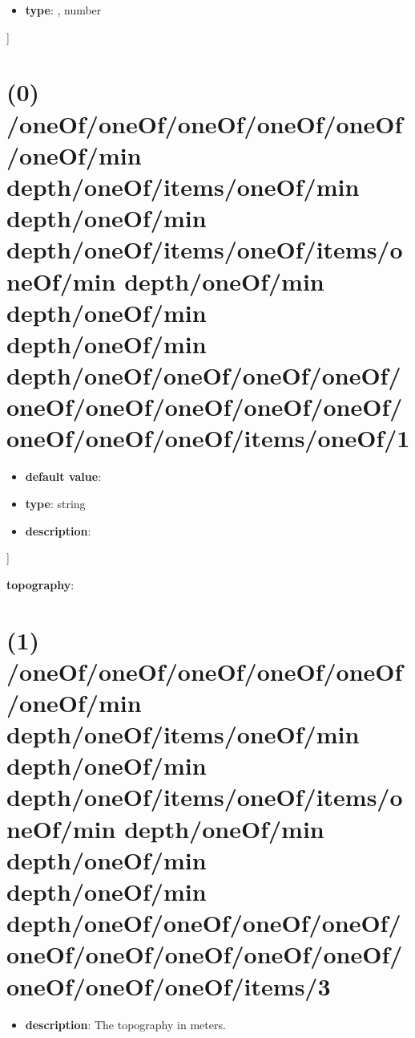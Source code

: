 \begin{itemize}[leftmargin=5em]\item {\bf type}: , number\end{itemize}]\section{(0) /oneOf/oneOf/oneOf/oneOf/oneOf/oneOf/min depth/oneOf/items/oneOf/min depth/oneOf/min depth/oneOf/items/oneOf/items/oneOf/min depth/oneOf/min depth/oneOf/min depth/oneOf/min depth/oneOf/oneOf/oneOf/oneOf/oneOf/oneOf/oneOf/oneOf/oneOf/oneOf/oneOf/oneOf/items/oneOf/1}
\begin{itemize}[leftmargin=0em]\item {\bf default value}: 
\item {\bf type}: string
\item {\bf description}: 
\end{itemize}]\item {\bf topography}: \section{(1) /oneOf/oneOf/oneOf/oneOf/oneOf/oneOf/min depth/oneOf/items/oneOf/min depth/oneOf/min depth/oneOf/items/oneOf/items/oneOf/min depth/oneOf/min depth/oneOf/min depth/oneOf/min depth/oneOf/oneOf/oneOf/oneOf/oneOf/oneOf/oneOf/oneOf/oneOf/oneOf/oneOf/oneOf/items/3}
\begin{itemize}[leftmargin=1em]\item {\bf description}: The topography in meters.
\end{itemize}
